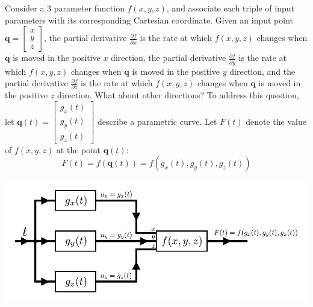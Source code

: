 \documentclass{article}
\begin{document}
Consider a 3 parameter function \(f(x,y,z)\), and associate each triple of input parameters with its corresponding Cartesian coordinate. Given an input point \(\mathbf{q} = \begin{bmatrix} x \\ y \\ z \end{bmatrix}\), the partial derivative \(\frac{\partial f}{\partial x}\) is the rate at which \(f(x, y, z)\) changes when \(\mathbf{q}\) is moved in the positive \(x\) direction, the partial derivative \(\frac{\partial f}{\partial y}\) is the rate at which \(f(x, y, z)\) changes when \(\mathbf{q}\) is moved in the positive \(y\) direction, and the partial derivative \(\frac{\partial f}{\partial z}\) is the rate at which \(f(x, y, z)\) changes when \(\mathbf{q}\) is moved in the positive \(z\) direction. What about other directions? To address this question, let \(\mathbf{q}(t) = \begin{bmatrix} g_x(t) \\ g_y(t) \\ g_z(t) \end{bmatrix}\) describe a parametric curve. Let \(F(t)\) denote the value of \(f(x, y, z)\) at the point \(\mathbf{q}(t)\):
\[F(t) = f(\mathbf{q}(t)) = f(g_x(t), g_y(t), g_z(t))\]

\begin{center}
\includegraphics[width = \textwidth]{vector_valued_function_followed_by_3_parameter_function}
\end{center}
\end{document}
